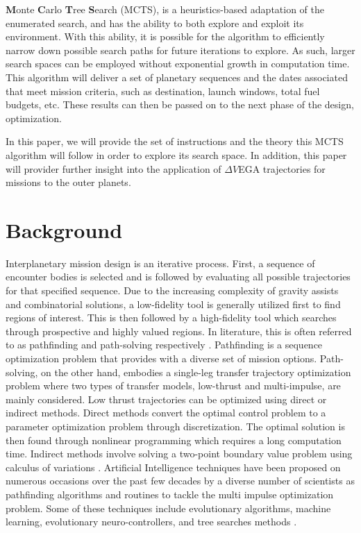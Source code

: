 \documentclass[letterpaper, preprint, paper,11pt]{AAS}	%
\begin{document}
\textbf{M}onte \textbf{C}arlo \textbf{T}ree \textbf{S}earch (MCTS), is a heuristics-based adaptation of the enumerated search, and has the ability to both explore and exploit its environment. With this ability, it is possible for the algorithm to efficiently narrow down possible search paths for future iterations to explore. As such, larger search spaces can be employed without exponential growth in computation time. This algorithm will deliver a set of planetary sequences and the dates associated that meet mission criteria, such as destination, launch windows, total fuel budgets, etc. These results can then be passed on to the next phase of the design, optimization.

In this paper, we will provide the set of instructions and the theory this MCTS algorithm will follow in order to explore its search space. In addition, this paper will provider further insight into the application of $\Delta V$EGA trajectories for missions to the outer planets.

\section{Background}

Interplanetary mission design is an iterative process. First, a sequence of encounter bodies is selected and is followed by evaluating all possible trajectories for that specified sequence. Due to the increasing complexity of gravity assists and combinatorial solutions, a low-fidelity tool is generally utilized first to find regions of interest. This is then followed by a high-fidelity tool which searches through prospective and highly valued regions.  In literature, this is often referred to as pathfinding and path-solving respectively \cite{Hughes2016}. Pathfinding is a sequence optimization problem that provides with a diverse set of mission options. Path-solving, on the other hand, embodies a single-leg transfer trajectory optimization problem where two types of transfer models, low-thrust and multi-impulse, are mainly considered\cite{Li2019}. Low thrust trajectories can be optimized using direct or indirect methods. Direct methods convert the optimal control problem to a parameter optimization problem through discretization. The optimal solution is then found through nonlinear programming which requires a long computation time. Indirect methods involve solving a two-point boundary value problem using calculus of variations \cite{Jiang2012}. Artificial Intelligence techniques have been proposed on numerous occasions over the past few decades by a diverse number of scientists as pathfinding algorithms and routines to tackle the multi impulse optimization problem. Some of these techniques include evolutionary algorithms, machine learning, evolutionary neuro-controllers, and tree searches methods \cite{Izzo2019}.
\end{document}
